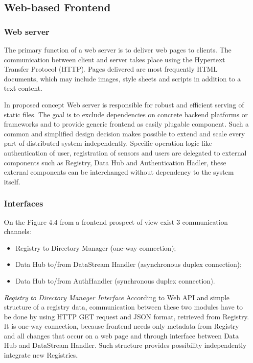   \subsection{Web-based Frontend}
    \subsubsection{Web server}
      The primary function of a web server is to deliver web pages to clients. The communication between client and server takes place using the Hypertext Transfer Protocol (HTTP). Pages delivered are most frequently HTML documents, which may include images, style sheets and scripts in addition to a text content. 
  
      In proposed concept Web server is responsible for robust and efficient serving of static files. The goal is to exclude dependencies on concrete backend platforms or frameworks and to provide generic frontend as easily plugable component. Such a common and simplified design decision makes possible to extend and scale every part of distributed system independently. Specific operation logic like authentication of user, registration of sensors and users are delegated to external components such as Registry, Data Hub and Authentication Hadler, these external components can be interchanged without dependency to the system itself.

    \subsubsection{Interfaces}
      On the Figure 4.4 from a frontend prospect of view exist 3 communication channels: 
      \begin{itemize}
      \item Registry to Directory Manager (one-way connection);
      \item Data Hub to/from DataStream Handler (asynchronous duplex connection);
      \item Data Hub to/from AuthHandler (synchronous duplex connection). 
      \end{itemize}

      \emph{Registry to Directory Manager Interface}
      \newline
      According to Web API and simple structure of a registry data, communication between these two modules have to be done by using HTTP GET request and JSON format, retrieved from Registry. It is one-way connection, because frontend needs only metadata from Registry and all changes that occur on a web page and through interface between Data Hub and DataStream Handler. Such structure provides possibility independently integrate new Registries.


